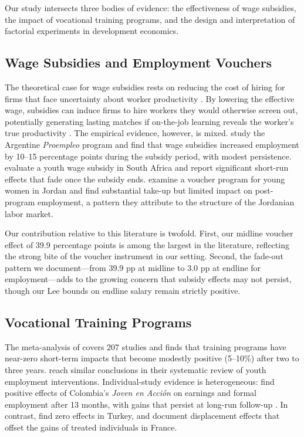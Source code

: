 \documentclass[12pt]{article}
\begin{document}
Our study intersects three bodies of evidence: the effectiveness of wage subsidies, the impact of vocational training programs, and the design and interpretation of factorial experiments in development economics.

\subsection{Wage Subsidies and Employment Vouchers}

The theoretical case for wage subsidies rests on reducing the cost of hiring for firms that face uncertainty about worker productivity \citep{katz1998wage, pallais2014inefficient}. By lowering the effective wage, subsidies can induce firms to hire workers they would otherwise screen out, potentially generating lasting matches if on-the-job learning reveals the worker's true productivity \citep{jovanovic1979job}. The empirical evidence, however, is mixed. \citet{galasso2004wage} study the Argentine \emph{Proempleo} program and find that wage subsidies increased employment by 10--15 percentage points during the subsidy period, with modest persistence. \citet{levinsohn2014subsidizing} evaluate a youth wage subsidy in South Africa and report significant short-run effects that fade once the subsidy ends. \citet{groh2016wage} examine a voucher program for young women in Jordan and find substantial take-up but limited impact on post-program employment, a pattern they attribute to the structure of the Jordanian labor market.

Our contribution relative to this literature is twofold. First, our midline voucher effect of 39.9 percentage points is among the largest in the literature, reflecting the strong bite of the voucher instrument in our setting. Second, the fade-out pattern we document---from 39.9 pp at midline to 3.0 pp at endline for employment---adds to the growing concern that subsidy effects may not persist, though our Lee bounds on endline salary remain strictly positive.

\subsection{Vocational Training Programs}

The meta-analysis of \citet{card2018what} covers 207 studies and finds that training programs have near-zero short-term impacts that become modestly positive (5--10\%) after two to three years. \citet{kluve2019interventions} reach similar conclusions in their systematic review of youth employment interventions. Individual-study evidence is heterogeneous: \citet{attanasio2011subsidizing} find positive effects of Colombia's \emph{Joven en Acci\'on} on earnings and formal employment after 13 months, with gains that persist at long-run follow-up \citep{ibarraran2019experimental}. In contrast, \citet{hirshleifer2016impact} find zero effects in Turkey, and \citet{crepon2013labor} document displacement effects that offset the gains of treated individuals in France.
\end{document}
